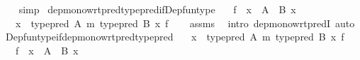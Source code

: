 \begin{isabellebody}
%
\isadelimproof
\ \ %
\endisadelimproof
%
\isatagproof
{}\isamarkupfalse%
\ simp%
\endisatagproof
{\isafoldproof}%
%
\isadelimproof
%
\endisadelimproof
%
\isadelimdocument
%
\endisadelimdocument
%
\isatagdocument
%
\isamarkuptrue%
%
\endisatagdocument
{\isafolddocument}%
%
\isadelimdocument
%
\endisadelimdocument
{}\isamarkupfalse%
\ dep{\isacharunderscore}{\kern0pt}mono{\isacharunderscore}{\kern0pt}wrt{\isacharunderscore}{\kern0pt}pred{\isacharunderscore}{\kern0pt}type{\isacharunderscore}{\kern0pt}pred{\isacharunderscore}{\kern0pt}if{\isacharunderscore}{\kern0pt}Dep{\isacharunderscore}{\kern0pt}fun{\isacharunderscore}{\kern0pt}type{\isacharcolon}{\kern0pt}\isanewline
\ \ \ {\isachardoublequoteopen}f\ {\isacharcolon}{\kern0pt}\ {\isacharparenleft}{\kern0pt}x\ {\isacharcolon}{\kern0pt}\ A{\isacharparenright}{\kern0pt}\ {\isasymRightarrow}\ B\ x{\isachardoublequoteclose}\isanewline
\ \ \ {\isachardoublequoteopen}{\isacharparenleft}{\kern0pt}{\isacharbrackleft}{\kern0pt}x\ {\isasymColon}\ type{\isacharunderscore}{\kern0pt}pred\ A{\isacharbrackright}{\kern0pt}\ {\isasymRrightarrow}\isactrlsub m\ type{\isacharunderscore}{\kern0pt}pred\ {\isacharparenleft}{\kern0pt}B\ x{\isacharparenright}{\kern0pt}{\isacharparenright}{\kern0pt}\ f{\isachardoublequoteclose}\isanewline
%
\isadelimproof
\ \ %
\endisadelimproof
%
\isatagproof
{}\isamarkupfalse%
\ assms\ \isamarkupfalse%
\ {\isacharparenleft}{\kern0pt}intro\ dep{\isacharunderscore}{\kern0pt}mono{\isacharunderscore}{\kern0pt}wrt{\isacharunderscore}{\kern0pt}predI{\isacharparenright}{\kern0pt}\ auto%
\endisatagproof
{\isafoldproof}%
%
\isadelimproof
\isanewline
%
\endisadelimproof
\isanewline
{}\isamarkupfalse%
\ Dep{\isacharunderscore}{\kern0pt}fun{\isacharunderscore}{\kern0pt}type{\isacharunderscore}{\kern0pt}if{\isacharunderscore}{\kern0pt}dep{\isacharunderscore}{\kern0pt}mono{\isacharunderscore}{\kern0pt}wrt{\isacharunderscore}{\kern0pt}pred{\isacharunderscore}{\kern0pt}type{\isacharunderscore}{\kern0pt}pred{\isacharcolon}{\kern0pt}\isanewline
\ \ \ {\isachardoublequoteopen}{\isacharparenleft}{\kern0pt}{\isacharbrackleft}{\kern0pt}x\ {\isasymColon}\ type{\isacharunderscore}{\kern0pt}pred\ A{\isacharbrackright}{\kern0pt}\ {\isasymRrightarrow}\isactrlsub m\ type{\isacharunderscore}{\kern0pt}pred\ {\isacharparenleft}{\kern0pt}B\ x{\isacharparenright}{\kern0pt}{\isacharparenright}{\kern0pt}\ f{\isachardoublequoteclose}\isanewline
\ \ \ {\isachardoublequoteopen}f\ {\isacharcolon}{\kern0pt}\ {\isacharparenleft}{\kern0pt}x\ {\isacharcolon}{\kern0pt}\ A{\isacharparenright}{\kern0pt}\ {\isasymRightarrow}\ B\ x{\isachardoublequoteclose}\isanewline

\end{isabellebody}
